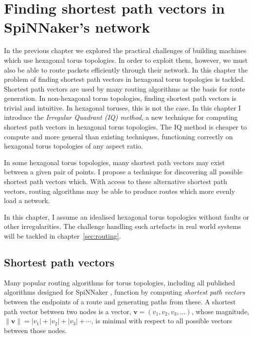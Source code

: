 \chapter{Finding shortest path vectors in SpiNNaker's network}
	
	\label{sec:shortestPaths}
	
	
	In the previous chapter we explored the practical challenges of building
	machines which use hexagonal torus topologies. In order to exploit them,
	however, we must also be able to route packets efficiently through their
	network. In this chapter the problem of finding shortest path vectors in
	hexagonal torus topologies is tackled. Shortest path vectors are used by many
	routing algorithms as the basis for route generation. In non-hexagonal torus
	topologies, finding shortest path vectors is trivial and intuitive. In
	hexagonal toruses, this is not the case. In this chapter I introduce the
	\emph{Irregular Quadrant (IQ) method}, a new technique for computing shortest
	path vectors in hexagonal torus topologies.  The IQ method is cheaper to
	compute and more general than existing techniques, functioning correctly on
	hexagonal torus topologies of any aspect ratio.
	
	In some hexagonal torus topologies, many shortest path vectors may exist
	between a given pair of points. I propose a technique for discovering all
	possible shortest path vectors which. With access to these alternative
	shortest path vectors, routing algorithms may be able to produce routes which
	more evenly load a network.
	
	In this chapter, I assume an idealised hexagonal torus topologies without
	faults or other irregularities. The challenge handling such artefacts in real
	world systems will be tackled in chapter~\ref{sec:routing}.
	
	\section{Shortest path vectors}
		
		Many popular routing algorithms for torus topologies, including all
		published algorithms designed for SpiNNaker \cite{davies12,navaridas14},
		function by computing \emph{shortest path vectors} between the endpoints of
		a route and generating paths from these. A shortest path vector between two
		nodes is a vector, $\mathbf{v} = (v_1, v_2, v_3, \ldots)$, whose magnitude,
		$\| \mathbf{v} \| = \lvert v_1 \rvert + \lvert v_2 \rvert + \lvert v_3
		\rvert + \cdots$, is minimal with respect to all possible vectors between
		those nodes.
		
